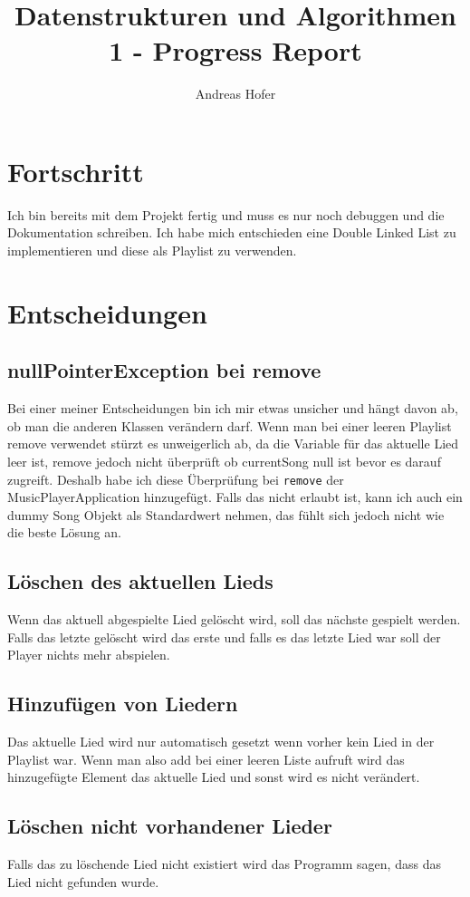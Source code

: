 \documentclass{article}
\title{\vspace{-1cm}Datenstrukturen und Algorithmen 1 - Progress Report}
\author{Andreas Hofer}
\begin{document}
	\maketitle
	\section*{Fortschritt}
	Ich bin bereits mit dem Projekt fertig und muss es nur noch debuggen und die Dokumentation schreiben. Ich habe mich entschieden eine Double Linked List zu implementieren und diese als Playlist zu verwenden.
	\section*{Entscheidungen}
	\subsection*{nullPointerException bei remove}
	Bei einer meiner Entscheidungen bin ich mir etwas unsicher und hängt davon ab, ob man die anderen Klassen verändern darf. Wenn man bei einer leeren Playlist remove verwendet stürzt es unweigerlich ab, da die Variable für das aktuelle Lied leer ist, remove jedoch nicht überprüft ob currentSong null ist bevor es darauf zugreift. Deshalb habe ich diese Überprüfung bei \texttt{remove} der MusicPlayerApplication hinzugefügt. Falls das nicht erlaubt ist, kann ich auch ein dummy Song Objekt als Standardwert nehmen, das fühlt sich jedoch nicht wie die beste Lösung an.
	\subsection*{Löschen des aktuellen Lieds}
	Wenn das aktuell abgespielte Lied gelöscht wird, soll das nächste gespielt werden. Falls das letzte gelöscht wird das erste und falls es das letzte Lied war soll der Player nichts mehr abspielen.
	\subsection*{Hinzufügen von Liedern}
	Das aktuelle Lied wird nur automatisch gesetzt wenn vorher kein Lied in der Playlist war. Wenn man also add bei einer leeren Liste aufruft wird das hinzugefügte Element das aktuelle Lied und sonst wird es nicht verändert.
	\subsection*{Löschen nicht vorhandener Lieder}
	Falls das zu löschende Lied nicht existiert wird das Programm sagen, dass das Lied nicht gefunden wurde.
\end{document}
